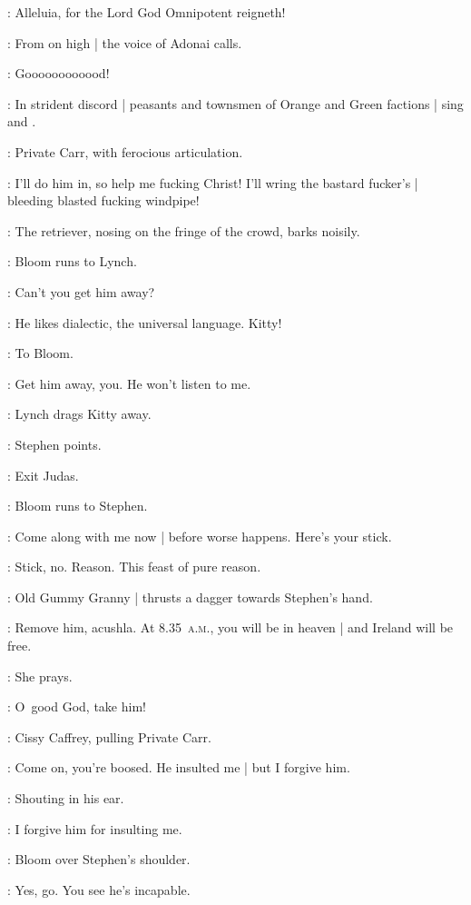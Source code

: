\VoiceAllBlessed[7a]:
Alleluia,
for the Lord God Omnipotent reigneth!

:
From on high |
the voice of Adonai calls.

\Adonai:
Goooooooooood!

:
In strident discord |
peasants and townsmen of Orange and Green factions |
sing 
and .

:
Private Carr,
with ferocious articulation.

\Carr:
I'll do him in,
so help me fucking Christ!
I'll wring the bastard fucker's |
bleeding blasted fucking windpipe!

:
The retriever,
nosing on the fringe of the crowd,
barks noisily.

:
Bloom runs to Lynch.

\Bloom:
Can't you get him away?

\Lynch:
He likes dialectic,
the universal language.
Kitty!

:
To Bloom.

\Lynch:
Get him away,
you.
He won't listen to me.

:
Lynch drags Kitty away.

:
Stephen points.

\Stephen:
Exit Judas.

:
Bloom runs to Stephen.

\Bloom:
Come along with me now |
before worse happens.
Here's your stick.

\Stephen:
Stick,
no.
Reason.
This feast of pure reason.

:
Old Gummy Granny |
thrusts a dagger towards Stephen's hand.

\GummyGranny:
Remove him,
acushla.
At 8.35~\textsc{a.m.},
you will be in heaven |
and Ireland will be free.

:
She prays.

\GummyGranny:
O~good God,
take him!

:
Cissy Caffrey,
pulling Private Carr.

\Cissy:
Come on,
you're boosed.
He insulted me |
but I forgive him.

:
Shouting in his ear.

\Cissy:
I forgive him for insulting me.

:
Bloom over Stephen's shoulder.

\Bloom:
Yes,
go.
You see he's incapable.

